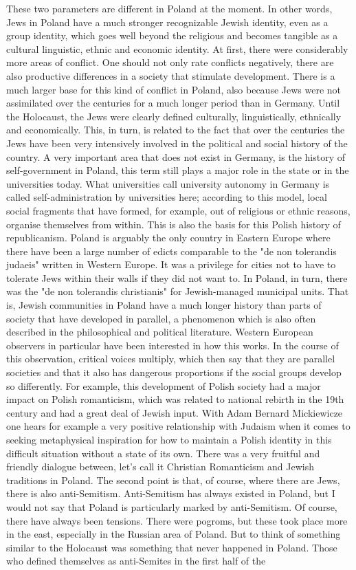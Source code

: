 These two parameters are different in Poland at the moment. In other words, Jews in Poland have a much stronger recognizable Jewish identity, even as a group identity, which goes well beyond the religious and becomes tangible as a cultural linguistic, ethnic and economic identity. At first, there were considerably more areas of conflict. One should not only rate conflicts negatively, there are also productive differences in a society that stimulate development. There is a much larger base for this kind of conflict in Poland, also because Jews were not assimilated over the centuries for a much longer period than in Germany. Until the Holocaust, the Jews were clearly defined culturally, linguistically, ethnically and economically. This, in turn, is related to the fact that over the centuries the Jews have been very intensively involved in the political and social history of the country. A very important area that does not exist in Germany, is the history of self-government in Poland, this term still plays a major role in the state or in the universities today. What universities call university autonomy in Germany is called self-administration by universities here; according to this model, local social fragments that have formed, for example, out of religious or ethnic reasons, organise themselves from within. This is also the basis for this Polish history of republicanism. Poland is arguably the only country in Eastern Europe where there have been a large number of edicts comparable to the "de non tolerandis judaeis" written in Western Europe. It was a privilege for cities not to have to tolerate Jews within their walls if they did not want to. In Poland, in turn, there was the "de non tolerandis christianis" for Jewish-managed municipal units. That is, Jewish communities in Poland have a much longer history than parts of society that have developed in parallel, a phenomenon which is also often described in the philosophical and political literature. Western European observers in particular have been interested in how this works. In the course of this observation, critical voices multiply, which then say that they are parallel societies and that it also has dangerous proportions if the social groups develop so differently. For example, this development of Polish society had a major impact on Polish romanticism, which was related to national rebirth in the 19th century and had a great deal of Jewish input. With Adam Bernard Mickiewicze one hears for example a very positive relationship with Judaism when it comes to seeking metaphysical inspiration for how to maintain a Polish identity in this difficult situation without a state of its own. There was a very fruitful and friendly dialogue between, let's call it Christian Romanticism and Jewish traditions in Poland. The second point is that, of course, where there are Jews, there is also anti-Semitism. Anti-Semitism has always existed in Poland, but I would not say that Poland is particularly marked by anti-Semitism. Of course, there have always been tensions. There were pogroms, but these took place more in the east, especially in the Russian area of Poland. But to think of something similar to the Holocaust was something that never happened in Poland. Those who defined themselves as anti-Semites in the first half of the 
